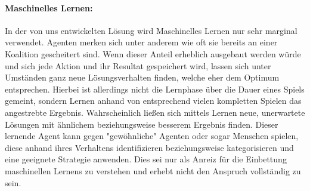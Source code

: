 \documentclass[fleqn,10pt]{SelfArx} %
\begin{document}
\paragraph{Maschinelles Lernen:} 
In der von uns entwickelten Lösung wird Maschinelles Lernen nur sehr marginal verwendet. Agenten merken sich unter anderem wie oft sie bereits an einer Koalition gescheitert sind. Wenn dieser Anteil erheblich ausgebaut werden würde und sich jede Aktion und ihr Resultat gespeichert wird, lassen sich unter Umständen ganz neue Lösungsverhalten finden, welche eher dem Optimum entsprechen. Hierbei ist allerdings nicht die Lernphase über die Dauer eines Spiels gemeint, sondern Lernen anhand von entsprechend vielen kompletten Spielen das angestrebte Ergebnis. Wahrscheinlich ließen sich mittels Lernen neue, unerwartete Lösungen mit ähnlichem beziehungsweise besserem Ergebnis finden. Dieser lernende Agent kann gegen "gewöhnliche" Agenten oder sogar Menschen spielen, diese anhand ihres Verhaltens identifizieren beziehungsweise kategorisieren und eine geeignete Strategie anwenden. Dies sei nur als Anreiz für die Einbettung maschinellen Lernens zu verstehen und erhebt nicht den Anspruch vollständig zu sein.
\end{document}
